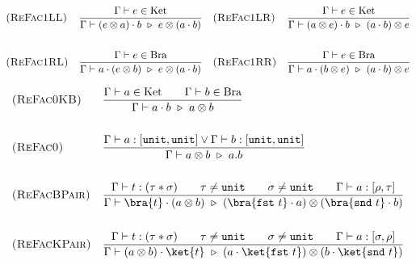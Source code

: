 \begin{align*}
  & \textsc{(ReFac1LL)} && \frac{\Gamma \vdash e \in \textrm{Ket}}{\Gamma \vdash (e \otimes a) \cdot b \ \triangleright\  e \otimes (a \cdot b)}
  && \textsc{(ReFac1LR)} && \frac{\Gamma \vdash e \in \textrm{Ket}}{\Gamma \vdash (a \otimes e) \cdot b \ \triangleright\  (a \cdot b) \otimes e} \\
  \\
  & \textsc{(ReFac1RL)} && \frac{\Gamma \vdash e \in \textrm{Bra}}{\Gamma \vdash a \cdot (e \otimes b) \ \triangleright\  e \otimes (a \cdot b)} 
  && \textsc{(ReFac1RR)} && \frac{\Gamma \vdash e \in \textrm{Bra}}{\Gamma \vdash a \cdot (b \otimes e) \ \triangleright\  (a \cdot b) \otimes e} \\
\end{align*}

\begin{align*}
  & \textsc{(ReFac0KB)} && \frac{\Gamma \vdash a \in \textrm{Ket} \qquad \Gamma \vdash b \in \textrm{Bra}}{\Gamma \vdash a \cdot b \reduce a \otimes b} \\
  \\
  & \textsc{(ReFac0)} && \frac{\Gamma \vdash a : [\unit, \unit] \vee \Gamma \vdash b : [\unit, \unit]}{\Gamma \vdash a \otimes b \reduce a.b} \\
  \\
  & \textsc{(ReFacBPair)} && \frac{\Gamma \vdash t : (\tau * \sigma) \qquad \tau \neq \unit \qquad \sigma \neq \unit \qquad \Gamma \vdash a : [\rho, \tau]}{\Gamma \vdash \bra{t} \cdot (a \otimes b) \reduce (\bra{\fst\ t} \cdot a) \otimes (\bra{\snd\ t} \cdot b)} \\
  \\
  & \textsc{(ReFacKPair)} && \frac{\Gamma \vdash t : (\tau * \sigma) \qquad \tau \neq \unit \qquad \sigma \neq \unit \qquad \Gamma \vdash a : [\sigma, \rho]}{\Gamma \vdash (a \otimes b) \cdot \ket{t}  \reduce (a \cdot \ket{\fst\ t}) \otimes (b \cdot \ket{\snd\ t})}
\end{align*}


